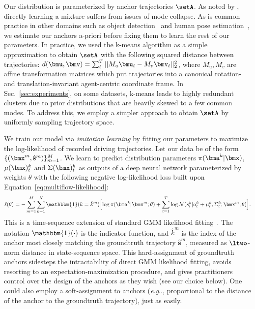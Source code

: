 \documentclass{article}
\makeatletter
\DeclareRobustCommand\onedot{\futurelet\@let@token\@onedot}
\def\@onedot{\ifx\@let@token.\else.\null\fi\xspace}
\def\eg{\emph{e.g}\onedot} \def\Eg{\emph{E.g}\onedot}
\makeatother
\begin{document}
Our distribution is parameterized by anchor trajectories $\setA$. As noted by \cite{Hong19, Bishop06}, directly learning a mixture suffers from issues of mode collapse. As is common practice in other domains such as object detection~\cite{Liu16} and human pose estimation~\cite{Yang12}, we estimate our anchors a-priori before fixing them to learn the rest of our parameters.
In practice, we used the k-means algorithm as a simple approximation to obtain $\setA$ with the following squared distance between trajectories: $d(\bmu, \bmv) = \sum_t^T ||M_u \bmu_t - M_v \bmv_t||_2^2$, where $M_u,M_v$ are affine transformation matrices which put trajectories into a canonical rotation- and translation-invariant agent-centric coordinate frame. In Sec.~\ref{sec:experiments}, on some datasets, k-means leads to highly redundant clusters due to prior distributions that are heavily skewed to a few common modes. To address this, we employ a simpler approach to obtain $\setA$ by uniformly sampling trajectory space.

We train our model via {\em imitation learning} by fitting our parameters to maximize the log-likelihood of recorded driving trajectories. 
Let our data be of the form $\{(\bmx^m,\mathbf{\hat{s}}^m)\}_{m=1}^M$. We learn to predict distribution parameters $\pi(\bma^k|\bmx)$, $\mu(\bmx)^k_t$ and $\Sigma(\bmx)^k_t$ as outputs of a deep neural network parameterized by weights $\theta$ with the following negative log-likelihood loss built upon Equation~\ref{eq:multiflow-likelihood}:
\begin{align}
    \ell(\theta) =  - \sum_{m=1}^M \sum_{k=1}^K \mathbbm{1}(k=\hat{k}^m) \Bigl[ \log \pi(\bma^k |\bmx^m; \theta) +  \sum_{t=1}^T  \log \mathcal{N}(s^k_t | a^k_t + \mu^k_t, \Sigma^k_t; \bmx^m; \theta)\Bigr].
\end{align}
This is a time-sequence extension of standard GMM likelihood fitting~\cite{Bishop06}. The notation $\mathbbm{1}(\cdot)$ is the indicator function, and $\hat{k}^m$ is the index of the anchor most closely matching the groundtruth trajectory $\mathbf{\hat{s}}^m$, measured as $\ltwo$-norm distance in state-sequence space.  This hard-assignment of groundtruth anchors sidesteps the intractability of direct GMM likelihood fitting, avoids resorting to an expectation-maximization procedure, and gives practitioners control over the design of the anchors as they wish (see our choice below).  One could also employ a soft-assignment to anchors (\eg, proportional to the distance of the anchor to the groundtruth trajectory), just as easily.
\end{document}
